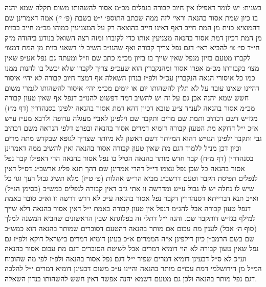 \documentclass[12pt, openany]{book}
\begin{document}
\begin{multicols}{2}
בשנית: יש לומר דאפילו אין חיוב קבורה בנפלים מכ״מ אסור להשהותו משום תקלה שמא יהנה בו כיון שמת אסור בהנאה וראי׳ לזה ממה שכתב התוספ׳ י״ט בשבת (פ׳ י׳) אמה דאמרינן שם דהמוציא כזית מן המת חייב דאף דאינו חייב בהוצאה רק על המצניעין כמוהו מכ״מ חייב בכזית מן המת דכיון דמת אסור בהנאה מצניעין אותו כדי לקוברו ומזה רצה השואל בנודע ביהודה מ״ק חי״ד סי׳ צ׳ להביא ראי׳ דגם נפל צריך קבורה ואף שהנו״ב השיב לו דשאני כזית מן המת דמצו׳ לקברו מטעם בזיון מנפל שאין שייך בו בזיון מכ״מ כתב שם וז״ל ומעתה גם נפל אע״פ שאין מצו׳ בקבורתו מכ״מ אפרו אסור ומהנקברין הוא שעכ״פ צריך לקברו שלא יכשל בו להנות ממנו כמו כל איסורי הנאה הנקברין עכ״ל ולפ״ז בנדון השאלה אף דמצד חיוב קבורה לא יהי׳ איסור דהיינו שאינו עובר על לא תלין להשהותו יום או יומים מכ״מ יהי׳ איסור להשהותו לגמרי משום חשש שמא יהנה אכן גם על זה יש להשיב דמה דפשוט להנו״ב דנפל אף שאין טעון קבורה מכ״מ אסור בהנאה לענ״ד צ״ע טובא דכיון דהא דמת אסור בהנאה ילפינן בסנהדרין (דף מ״ז) מגז״ש דשם דכתיב ותמת שם מרים ותקבר שם וילפינן לאביי מעגלה ערופה ולרבא מע״ז ע״ש א״כ י״ל דדוקא מת הטעון קבורה דומיא דמרים אסור בהנאה ובפרט דלפי הנראה משם דכתיב גבי ותקבר ילפינן הגז״ש דהוא המיותר דשם ראשון לא מיותר שצריך לגופא שבקדש מתה מרים וכיון דכן מנ״ל ללמוד דגם מת שאין טעון קבורה אסור בהנאה ואין להשיב ממה דאמרינן בסנהדרין (דף מ״ח) קבר חדש מותר בהנאה הטיל בו נפל אסור בהנאה הרי דאפילו קבר נפל אסור בהנאה כל שכן נפל עצמו די״ל דהרי אמרינן שם דהך תנא פליג ארשב״ג דס״ל דאין לנפלים תפיסת הקבר וטעם דרשב״ג מביא הר״ש אהלות (פ׳ ט״ז) מלא תשיג גבול רעך וגו׳ כל שיש לו נחלה יש לו גבול ע״ש ומדרשה זו אתי ג״כ דאין קבורה לנפלים כמש״כ (בסימן הנ״ל) וא״כ תנא דברייתא דסנהדרין דקבר נפל אסור בהנאה ע״כ לא דרש דרשה זו וא״כ סובר באמת דנפל טעון קבורה אבל להג״מ דנפל אין טעון קבורה באמת י״ל דאין אסור בהנאה דלא שייך למילף בגז״ש דותקבר שם. והנה י״ל דתלי זה בפלוגתא שבין הראשונים שהביא המשנה למלך (סוף ה׳ אבל) לענין מת עכום אם מותר בהנאה דהטעם דסוברים שמותר בהנאה הוא כמש״כ שם בשם הרמב״ן כיון דילפינן א״ה הממרים א״כ בעינן דומיא דמרים בישראל דוקא ולפ״ז גם נפל שאין טעון קבורה לא הוי דומיא דמרים אבל לשיטת הסוברים דגם מת עכום אסור בהנאה וע״כ לא ס״ל דבעינן דומיא דמרים שפיר י״ל דגם נפל אסור בהנאה ולפ״ז לפי מה שהוכיח המ״ל מן הירושלמי דמת עכו״ם מותר בהנאה והיינו ע״כ משום דבעינן דומיא דמרים י״ל להלכה דגם נפל מותר בהנאה ולכן גם מטעם דשמא יהנה אפשר דאין חשש להשהותו בנדון השאלה.\\\vspace{0pt}


\end{multicols}
\end{document}
